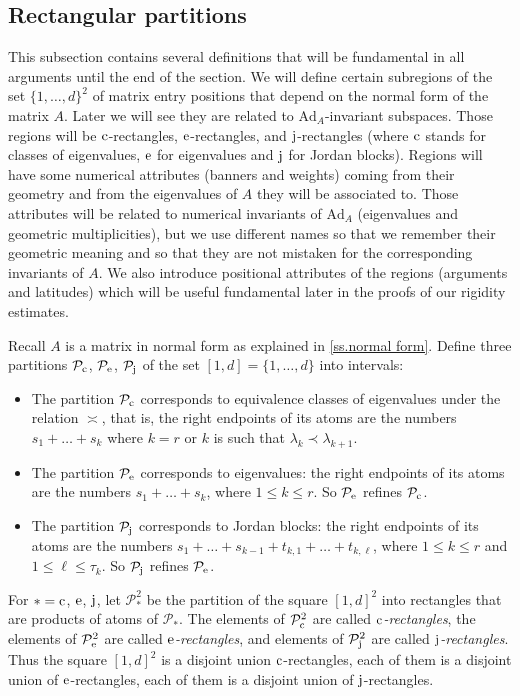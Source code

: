 \documentclass[10pt, a4paper]{amsart}
\theoremstyle{plain}
\theoremstyle{definition}
\theoremstyle{remark}
\theoremstyle{note}
\numberwithin{equation}{section}
\begin{document}
\subsection{Rectangular partitions}\label{ss.geo defs}

This subsection contains several definitions that will be fundamental in all 
arguments until the end of the section.
We will define certain subregions of the set $\{1,\dots,d\}^2$ of matrix entry positions
that depend on the normal form of the matrix $A$.
Later we will see they are related to ${\mathrm{Ad}}_A$-invariant subspaces.
Those regions will be $\rm c$-rectangles, $\rm e$-rectangles, and $\rm j$-rectangles 
(where $\rm c$ stands for classes of eigenvalues, $\rm e$ for eigenvalues and $\rm j$ for Jordan blocks).
Regions will have some numerical attributes (banners and weights) coming from their geometry and from the eigenvalues of $A$ they will be associated to. Those attributes will be related to 
numerical invariants of ${\mathrm{Ad}}_A$ (eigenvalues and geometric multiplicities), but we use different names so that we remember their geometric meaning and so that they are not mistaken for the corresponding invariants of $A$. We also introduce positional attributes of the regions (arguments and latitudes) which will be useful fundamental later in the proofs of our rigidity estimates.

\medskip

Recall $A$ is a matrix in normal form as explained in \cref{ss.normal form}.
Define three partitions ${\mathcal{P}}_{\rm c}$, ${\mathcal{P}}_{\rm e}$, ${\mathcal{P}}_{\rm j}$ of the set $[1,d] = \{1,\dots,d\}$ into intervals:
\begin{itemize}
\item The partition ${\mathcal{P}}_{\rm c}$ corresponds to equivalence classes of eigenvalues 
under the relation $\asymp$, that is, 
the right endpoints of its atoms are the numbers 
$s_1 + \dots + s_k$
where $k=r$ or $k$ is such that $\lambda_k \prec \lambda_{k+1}$.
\item The partition ${\mathcal{P}}_{\rm e}$ corresponds to eigenvalues:
the right endpoints of its atoms are the numbers 
$s_1 + \dots + s_k$, where $1 \le k \le r$.
So ${\mathcal{P}}_{\rm e}$ refines ${\mathcal{P}}_{\rm c}$.
\item The partition ${\mathcal{P}}_{\rm j}$ corresponds to Jordan blocks:
the right endpoints of its atoms are the numbers 
$s_1 + \dots + s_{k-1} + t_{k,1} + \dots + t_{k,\ell}$, where $1 \le k \le r$
and $1 \le \ell \le \tau_k$.
So ${\mathcal{P}}_{\rm j}$ refines ${\mathcal{P}}_{\rm e}$.
\end{itemize}
For $*= \rm c$, $\rm e$, $\rm j$, let 
${\mathcal{P}}_*^2$ be the partition of the square $[1,d]^2$ 
into rectangles that are products of atoms of ${\mathcal{P}}_*$.
The elements of ${\mathcal{P}}_{\rm c}^2$ are called \emph{$\rm c$-rectangles}, 
the elements of ${\mathcal{P}}_{\rm e}^2$ are called \emph{$\rm e$-rectangles},
and elements of ${\mathcal{P}}_{\rm j}^2$ are called \emph{$\rm j$-rectangles}.
Thus the square $[1,d]^2$ is a disjoint union $\rm c$-rectangles,
each of them is a disjoint union of $\rm e$-rectangles,
each of them is a disjoint union of $\rm j$-rectangles.
\end{document}
